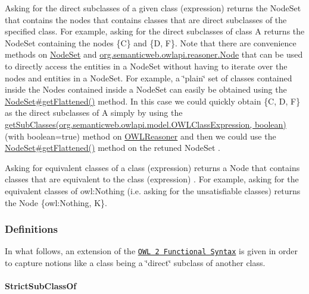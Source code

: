 Asking for the direct subclasses of a given class (expression) returns the {\ttfamily Node\-Set} that contains the nodes that contains classes that are direct subclasses of the specified class. For example, asking for the direct subclasses of class {\ttfamily A} returns the {\ttfamily Node\-Set} containing the nodes {\ttfamily \{C\}} and {\ttfamily \{D, F\}}. Note that there are convenience methods on \hyperlink{}{Node\-Set} and \hyperlink{}{org.\-semanticweb.\-owlapi.\-reasoner.\-Node} that can be used to directly access the entities in a {\ttfamily Node\-Set} without having to iterate over the nodes and entities in a {\ttfamily Node\-Set}. For example, a \char`\"{}plain\char`\"{} set of classes contained inside the {\ttfamily Nodes} contained inside a {\ttfamily Node\-Set} can easily be obtained using the \hyperlink{}{Node\-Set\#get\-Flattened()} method. In this case we could quickly obtain {\ttfamily \{C, D, F\}} as the direct subclasses of {\ttfamily A} simply by using the \hyperlink{interfaceorg_1_1semanticweb_1_1owlapi_1_1reasoner_1_1_o_w_l_reasoner_a30bc6e45c539a716c9bf2c702b622edc}{get\-Sub\-Classes(org.\-semanticweb.\-owlapi.\-model.\-O\-W\-L\-Class\-Expression, boolean)} (with boolean=true) method on {\ttfamily \hyperlink{interfaceorg_1_1semanticweb_1_1owlapi_1_1reasoner_1_1_o_w_l_reasoner}{O\-W\-L\-Reasoner}} and then we could use the \hyperlink{}{Node\-Set\#get\-Flattened()} method on the retuned {\ttfamily Node\-Set} . 

Asking for equivalent classes of a class (expression) returns a {\ttfamily Node} that contains classes that are equivalent to the class (expression) . For example, asking for the equivalent classes of {\ttfamily owl\-:Nothing} (i.\-e. asking for the unsatisfiable classes) returns the {\ttfamily Node} {\ttfamily \{owl\-:Nothing, K\}}. 

   

\subsubsection*{Definitions}

In what follows, an extension of the \href{http://www.w3.org/TR/2009/REC-owl2-syntax-20091027/}{\tt O\-W\-L 2 Functional Syntax} is given in order to capture notions like a class being a \char`\"{}direct\char`\"{} subclass of another class. 

\paragraph*{Strict\-Sub\-Class\-Of}

